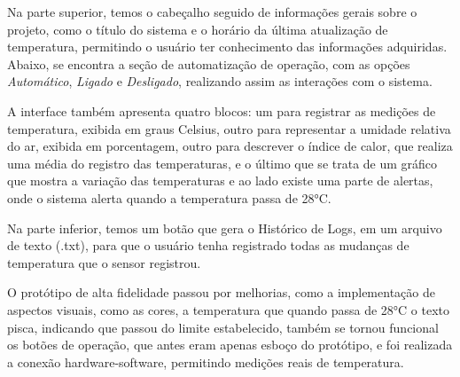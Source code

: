 Na parte superior, temos o cabeçalho seguido de informações gerais sobre o projeto, como o título do sistema e o horário da última atualização de temperatura, permitindo o usuário ter conhecimento das informações adquiridas. Abaixo, se encontra a seção de automatização de operação, com as opções \textit{Automático}, \textit{Ligado} e \textit{Desligado}, realizando assim as interações com o sistema.

A interface também apresenta quatro blocos: um para registrar as medições de temperatura, exibida em graus Celsius, outro para representar a umidade relativa do ar, exibida em porcentagem, outro para descrever o índice de calor, que realiza uma média do registro das temperaturas, e o último que se trata de um gráfico que mostra a variação das temperaturas e ao lado existe uma parte de alertas, onde o sistema alerta quando a temperatura passa de 28°C. 

Na parte inferior, temos um botão que gera o Histórico de Logs, em um arquivo de texto (.txt), para que o usuário tenha registrado todas as mudanças de temperatura que o sensor registrou.

O protótipo de alta fidelidade passou por melhorias, como a implementação de aspectos visuais, como as cores, a temperatura que quando passa de 28°C o texto pisca, indicando que passou do limite estabelecido, também se tornou funcional os botões de operação, que antes eram apenas esboço do protótipo, e foi realizada a conexão hardware-software, permitindo medições reais de temperatura.
